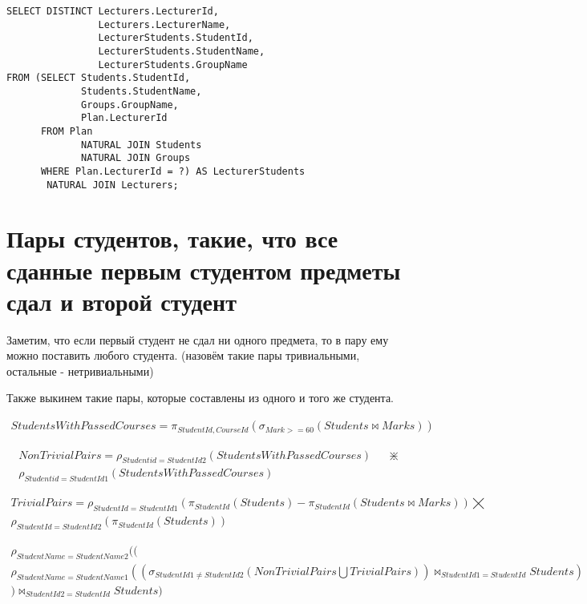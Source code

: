 \documentclass{article}
\begin{document}
\begin{verbatim}
SELECT DISTINCT Lecturers.LecturerId,
                Lecturers.LecturerName,
                LecturerStudents.StudentId,
                LecturerStudents.StudentName,
                LecturerStudents.GroupName
FROM (SELECT Students.StudentId,
             Students.StudentName,
             Groups.GroupName,
             Plan.LecturerId
      FROM Plan
             NATURAL JOIN Students
             NATURAL JOIN Groups
      WHERE Plan.LecturerId = ?) AS LecturerStudents
       NATURAL JOIN Lecturers;
\end{verbatim}

	\section{Пары студентов, такие, что все сданные первым студентом предметы сдал и второй студент}

	Заметим, что если первый студент не сдал ни одного предмета, то в пару ему можно поставить любого студента. (назовём такие пары тривиальными, остальные - нетривиальными)
	
	Также выкинем такие пары, которые составлены из одного и того же студента.
	
	\begin{align*}
	StudentsWithPassedCourses = \pi_{StudentId, CourseId}(\sigma_{Mark >= 60}(Students \bowtie Marks))
	\end{align*}
	
	\begin{align*}
	NonTrivialPairs = \rho_{Studentid = StudentId2}(StudentsWithPassedCourses) && \divideontimes \\
	\rho_{Studentid = StudentId1}(StudentsWithPassedCourses)
	\end{align*}
	
	\begin{align*}
	TrivialPairs = \rho_{StudentId = StudentId1}(\pi_{StudentId}(Students) - \pi_{StudentId}(Students \bowtie Marks)) \bigtimes\\
	\rho_{StudentId = StudentId2}(\pi_{StudentId}(Students))
	\end{align*}
	
	\begin{align*}
		\rho_{StudentName = StudentName2}(( \\
		\rho_{StudentName = StudentName1}((\sigma_{StudentId1 \neq StudentId2}(NonTrivialPairs \bigcup TrivialPairs)) \bowtie_{StudentId1 = StudentId} Students)\\
	) \bowtie_{StudentId2 = StudentId} Students)
	\end{align*}
\end{document}

